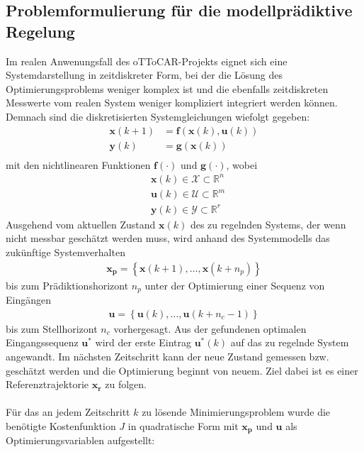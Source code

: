 \subsection{Problemformulierung für die modellprädiktive Regelung}
Im realen Anwenungsfall des oTToCAR-Projekts eignet sich eine Systemdarstellung in zeitdiskreter Form, bei der die Lösung des Optimierungsproblems weniger komplex ist und die ebenfalls zeitdiskreten Messwerte vom realen System weniger kompliziert integriert werden können. Demnach sind die diskretisierten Systemgleichungen wiefolgt gegeben:
\begin{align*}
  \boldsymbol{x}(k+1)&=\boldsymbol{f}\left ( \boldsymbol{x}(k), \boldsymbol{u}(k) \right )\\
  \boldsymbol{y}(k)&=\boldsymbol{g}\left ( \boldsymbol{x}(k) \right )\\
\end{align*}
mit den nichtlinearen Funktionen $\boldsymbol{f}\left ( \cdot \right )$ und $\boldsymbol{g}\left ( \cdot \right )$, wobei
\begin{align*}
  &\boldsymbol{x}(k) \in \mathcal{X}\subset\mathbb{R}^n\\
  &\boldsymbol{u}(k) \in \mathcal{U}\subset\mathbb{R}^m\\
  &\boldsymbol{y}(k) \in \mathcal{Y}\subset\mathbb{R}^r
\end{align*}
Ausgehend vom aktuellen Zustand $\boldsymbol{x}(k)$ des zu regelnden Systems, der wenn nicht messbar geschätzt werden muss, wird anhand des Systemmodells das zukünftige Systemverhalten
\begin{align*}
  \boldsymbol{x_p}=\left\{ \boldsymbol{x}(k+1),\dots,\boldsymbol{x}(k+n_p)\right\}
\end{align*}
bis zum Prädiktionshorizont $n_p$ unter der Optimierung einer Sequenz von Eingängen
\begin{align*}
  \boldsymbol{u}=\left\{ \boldsymbol{u}(k),\dots,\boldsymbol{u}(k+n_c-1)\right\}
\end{align*}
bis zum Stellhorizont $n_c$ vorhergesagt. Aus der gefundenen optimalen Eingangssequenz $\boldsymbol{u}^*$ wird der erste Eintrag $\boldsymbol{u}^*(k)$ auf das zu regelnde System angewandt. Im nächsten Zeitschritt kann der neue Zustand gemessen bzw. geschätzt werden und die Optimierung beginnt von neuem. Ziel dabei ist es einer Referenztrajektorie $\boldsymbol{x_r}$ zu folgen.\\ \\
Für das an jedem Zeitschritt $k$ zu lösende Minimierungsproblem wurde die benötigte Kostenfunktion $J$ in quadratische Form mit $\boldsymbol{x_p}$ und $\boldsymbol{u}$ als Optimierungsvariablen aufgestellt:
